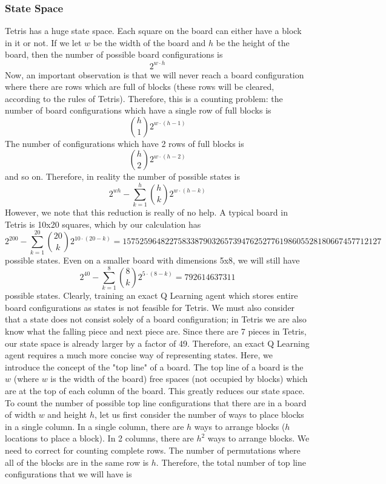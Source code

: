 \documentclass[11pt]{article}
\begin{document}
\subsubsection{State Space}
Tetris has a huge state space. Each square on the board can either have a block in it or not. If we let $w$ be the width of the board and $h$ be the height of the board, then the number of possible board configurations is $$2^{w\cdot h}$$
Now, an important observation is that we will never reach a board configuration where there are rows which are full of blocks (these rows will be cleared, according to the rules of Tetris). Therefore, this is a counting problem: the number of board configurations which have a single row of full blocks is
$$\binom{h}{1}2^{w\cdot(h-1)}$$
The number of configurations which have 2 rows of full blocks is
$$\binom{h}{2}2^{w\cdot(h-2)}$$
and so on. Therefore, in reality the number of possible states is
$$2^{wh} - \sum_{k=1}^{h}\binom{h}{k}2^{w\cdot(h-k)}$$
However, we note that this reduction is really of no help. A typical board in Tetris is 10x20 squares, which by our calculation has
$$2^{200} - \sum_{k=1}^{20}\binom{20}{k}2^{10\cdot(20-k)}=1575259648227583387903265739476252776198605528180667457712127$$
possible states. Even on a smaller board with dimensions 5x8, we will still have
$$2^{40} - \sum_{k=1}^{8}\binom{8}{k}2^{5\cdot(8-k)}=792614637311$$
possible states. Clearly, training an exact Q Learning agent which stores entire board configurations as states is not feasible for Tetris. We must also consider that a state does not consist solely of a board configuration; in Tetris we are also know what the falling piece and next piece are. Since there are 7 pieces in Tetris, our state space is already larger by a factor of 49. Therefore, an exact Q Learning agent requires a much more concise way of representing states. Here, we introduce the concept of the "top line" of a board. The top line of a board is the $w$ (where $w$ is the width of the board) free spaces (not occupied by blocks) which are at the top of each column of the board. This greatly reduces our state space. To count the number of possible top line configurations that there are in a board of width $w$ and height $h$, let us first consider the number of ways to place blocks in a single column. In a single column, there are $h$ ways to arrange blocks ($h$ locations to place a block). In 2 columns, there are $h^2$ ways to arrange blocks. We need to correct for counting complete rows. The number of permutations where all of the blocks are in the same row is $h$. Therefore, the total number of top line configurations that we will have is
\end{document}
